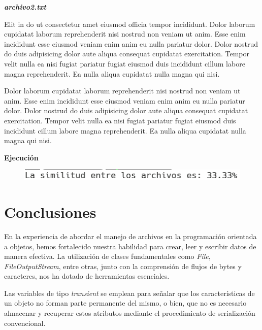 \documentclass[11pt, twocolumn]{article}
\begin{document}
  \textit{\textbf{archivo2.txt}}

  \begin{tiny}
    \ttfamily
    
    Elit in do ut consectetur amet eiusmod officia tempor incididunt. Dolor laborum cupidatat laborum reprehenderit nisi nostrud non veniam ut anim. Esse enim incididunt esse eiusmod veniam enim anim eu nulla pariatur dolor. Dolor nostrud do duis adipisicing dolor aute aliqua consequat cupidatat exercitation. Tempor velit nulla ea nisi fugiat pariatur fugiat eiusmod duis incididunt cillum labore magna reprehenderit. Ea nulla aliqua cupidatat nulla magna qui nisi.
  \end{tiny}

  \begin{tiny}
    \ttfamily

    Dolor laborum cupidatat laborum reprehenderit nisi nostrud non veniam ut anim. Esse enim incididunt esse eiusmod veniam enim anim eu nulla pariatur dolor. Dolor nostrud do duis adipisicing dolor aute aliqua consequat cupidatat exercitation. Tempor velit nulla ea nisi fugiat pariatur fugiat eiusmod duis incididunt cillum labore magna reprehenderit. Ea nulla aliqua cupidatat nulla magna qui nisi.
  \end{tiny}

  \textbf{Ejecución}
  \begin{figure}[h!]
    \centering
    \includegraphics[width=\columnwidth]{P4.png}
  \end{figure}

  \section*{Conclusiones}
  En la experiencia de abordar el manejo de archivos en la programación orientada a objetos, hemos fortalecido nuestra habilidad para crear, leer y escribir datos de manera efectiva. La utilización de clases fundamentales como \textit{File}, \textit{FileOutputStream}, entre otras, junto con la comprensión de flujos de bytes y caracteres, nos ha dotado de herramientas esenciales.

  Las variables de tipo \textit{transient} se emplean para señalar que los características de un objeto no forman parte permanente del mismo, o bien, que no es necesario almacenar y recuperar estos atributos mediante el procedimiento de serialización convencional.
\end{document}
